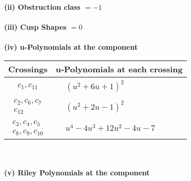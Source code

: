 \documentclass[1p]{elsarticle_modified}
\theoremstyle{definition}
\begin{document}
\flushleft \textbf{(ii) Obstruction class $= -1$}\\~\\
\flushleft \textbf{(iii) Cusp Shapes $= 0$}\\~\\
\newpage\renewcommand{\arraystretch}{1}
\flushleft \textbf{(iv) u-Polynomials at the component}\newline \\
\begin{tabular}{m{50pt}|m{274pt}}
Crossings & \hspace{64pt}u-Polynomials at each crossing \\
\hline $$\begin{aligned}c_{1},c_{11}\end{aligned}$$&$\begin{aligned}
&(u^2+6 u+1)^2
\end{aligned}$\\
\hline $$\begin{aligned}c_{2},c_{6},c_{7}\\c_{12}\end{aligned}$$&$\begin{aligned}
&(u^2+2 u-1)^2
\end{aligned}$\\
\hline $$\begin{aligned}c_{3},c_{4},c_{5}\\c_{8},c_{9},c_{10}\end{aligned}$$&$\begin{aligned}
&u^4-4 u^3+12 u^2-4 u-7
\end{aligned}$\\
\hline
\end{tabular}\\~\\
\newpage\renewcommand{\arraystretch}{1}
\flushleft \textbf{(v) Riley Polynomials at the component}\newline \\
\end{document}
